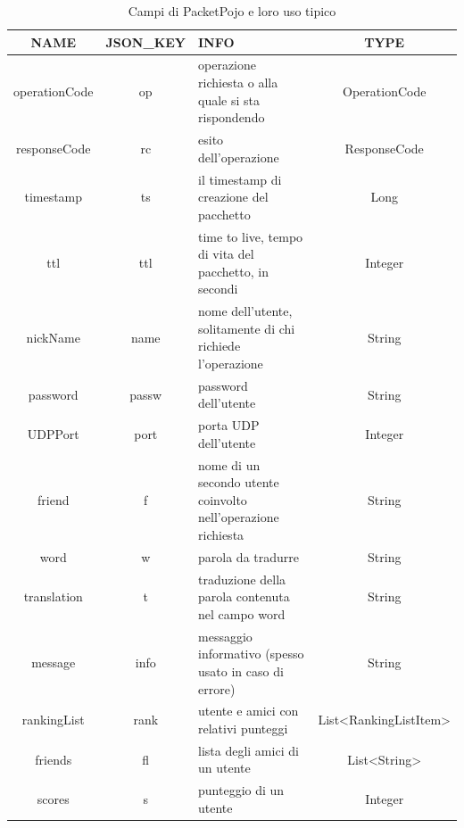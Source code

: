 \documentclass{article}
\begin{document}
     \begin{table}[h!]
        \centering
        \begin{tabular}{ |c|c|p{4cm}|c| }
         \hline
         \textbf{NAME} & \textbf{JSON\_KEY} & \textbf{INFO} & \textbf{TYPE} \\
         \hline
         operationCode & op & operazione richiesta o alla quale si sta rispondendo & OperationCode \\
         \hline
         responseCode & rc & esito dell'operazione & ResponseCode  \\
         \hline
         timestamp & ts & il timestamp di creazione del pacchetto & Long \\
         \hline
         ttl & ttl & time to live, tempo di vita del pacchetto, in secondi  & Integer \\
         \hline
         nickName & name & nome dell'utente, solitamente di chi richiede l'operazione & String \\
         \hline
         password & passw & password dell'utente & String \\
         \hline
         UDPPort & port & porta UDP dell'utente & Integer \\
         \hline
         friend & f & nome di un secondo utente coinvolto nell'operazione richiesta & String \\
         \hline
         word & w & parola da tradurre & String \\
         \hline
         translation & t & traduzione della parola contenuta nel campo word & String \\
         \hline
         message & info & messaggio informativo (spesso usato in caso di errore) & String \\
         \hline
         rankingList & rank & utente e amici con relativi punteggi & List<RankingListItem> \\
         \hline
         friends & fl & lista degli amici di un utente & List<String> \\
         \hline
         scores & s & punteggio di un utente & Integer \\
         \hline
        \end{tabular}
        \caption{Campi di PacketPojo e loro uso tipico}
        \label{table:commons_packets}
    \end{table}
\end{document}
